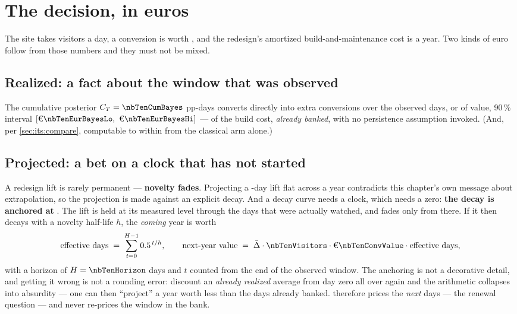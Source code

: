 \section{The decision, in euros}
\label{sec:its:euro}

The site takes \nbTenVisitors{} visitors a day, a conversion is worth \eur{\nbTenConvValue}, and
the redesign's amortized build-and-maintenance cost is \eur{\nbTenCost} a year. Two kinds of euro
follow from those numbers and they must not be mixed.

\subsection*{Realized: a fact about the window that was observed}

The cumulative posterior $C_T = \nbTenCumBayes$ pp-days converts directly into
\nbTenExtraConv{} extra conversions over the \nbTenNPost{} observed days, or
\eur{\nbTenEurBayes} of value, 90\,\% interval $[\eur{\nbTenEurBayesLo},\ \eur{\nbTenEurBayesHi}]$
--- \pc{\nbTenEurRealizedPctCost} of the \eur{\nbTenCost} build cost, \emph{already banked},
with no persistence assumption invoked. (And, per \cref{sec:its:compare}, computable to within
\eur{\nbTenEurGap} from the classical arm alone.)

\subsection*{Projected: a bet on a clock that has not started}

A redesign lift is rarely permanent --- \textbf{novelty fades}. Projecting a \nbTenNPost-day lift
flat across a year contradicts this chapter's own message about extrapolation, so the projection is
made against an explicit decay. And a decay curve needs a clock, which needs a zero: \textbf{the
decay is anchored at \nbTenDecayAnchor}. The lift is held at its measured level through the days
that were actually watched, and fades only from there. If it then decays with a novelty half-life
$h$, the \emph{coming} year is worth
%
\begin{equation}
  \text{effective days} \;=\; \sum_{t=0}^{H-1} 0.5^{\,t/h},
  \qquad
  \text{next-year value} \;=\; \bar\Delta \cdot \text{\nbTenVisitors} \cdot \text{\eur{\nbTenConvValue}}
                            \cdot \text{effective days},
  \label{eq:its:decay}
\end{equation}
%
with a horizon of $H = \nbTenHorizon$ days and $t$ counted from the end of the observed window. The anchoring is not a decorative detail, and
getting it wrong is not a rounding error: discount an \emph{already realized} average from day zero
all over again and the arithmetic collapses into absurdity --- one can then ``project'' a year worth
less than the \nbTenNPost{} days already banked.  therefore prices the
\emph{next} \nbTenHorizon{} days --- the renewal question --- and never re-prices the window in the
bank.

